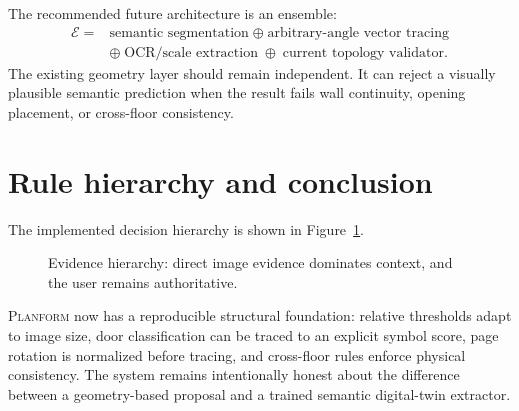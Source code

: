 \documentclass[11pt,a4paper]{article}
\newcommand{\Planform}{\textsc{Planform}}
\begin{document}
The recommended future architecture is an ensemble:
\begin{equation}
\begin{aligned}
\mathcal E={}&\text{semantic segmentation}
\;\oplus\;\text{arbitrary-angle vector tracing}\\
&\oplus\;\text{OCR/scale extraction}
\;\oplus\;\text{current topology validator}.
\end{aligned}
\end{equation}
The existing geometry layer should remain independent. It can reject a visually plausible semantic prediction when the result fails wall continuity, opening placement, or cross-floor consistency.

\section{Rule hierarchy and conclusion}

The implemented decision hierarchy is shown in Figure~\ref{fig:hierarchy}.

\begin{figure}[htbp]
\centering
{}
\caption{Evidence hierarchy: direct image evidence dominates context, and the user remains authoritative.}
\label{fig:hierarchy}
\end{figure}

\Planform{} now has a reproducible structural foundation: relative thresholds adapt to image size, door classification can be traced to an explicit symbol score, page rotation is normalized before tracing, and cross-floor rules enforce physical consistency. The system remains intentionally honest about the difference between a geometry-based proposal and a trained semantic digital-twin extractor.

\clearpage
\appendix
\end{document}
